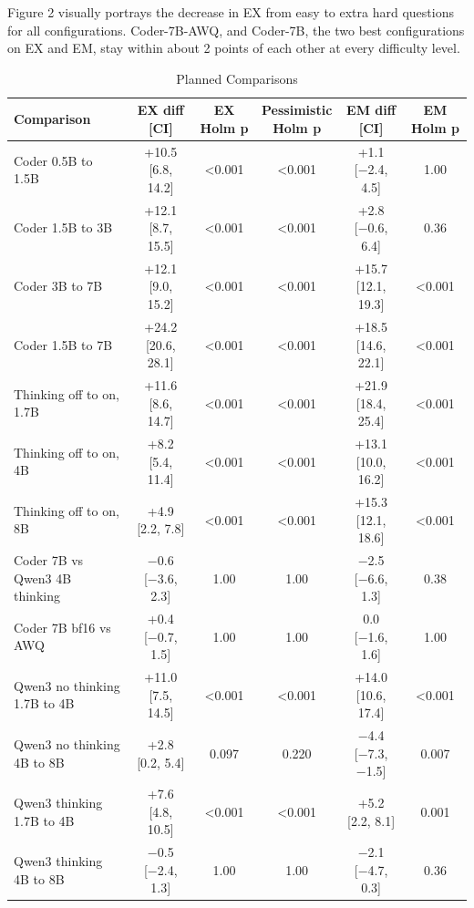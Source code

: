 Figure 2 visually portrays the decrease in EX from easy to extra hard questions for all configurations. Coder-7B-AWQ, and Coder-7B, the two best configurations on EX and EM, stay within about 2 points of each other at every difficulty level.

\begin{table}[!htbp]
\centering
\caption{Planned Comparisons}
\label{tab:4}
\small
\begin{adjustbox}{max width=\linewidth}
\begin{tabular}{@{}lccccc@{}}
\toprule
Comparison & EX diff [CI] & EX Holm p & \makecell{Pessimistic \\ {}Holm p} & EM diff [CI] & EM Holm p \\
\midrule
Coder 0.5B to 1.5B & +10.5 [6.8, 14.2] & \textless{}0.001 & \textless{}0.001 & +1.1 [−2.4, 4.5] & 1.00 \\
Coder 1.5B to 3B & +12.1 [8.7, 15.5] & \textless{}0.001 & \textless{}0.001 & +2.8 [−0.6, 6.4] & 0.36 \\
Coder 3B to 7B & +12.1 [9.0, 15.2] & \textless{}0.001 & \textless{}0.001 & +15.7 [12.1, 19.3] & \textless{}0.001 \\
Coder 1.5B to 7B & +24.2 [20.6, 28.1] & \textless{}0.001 & \textless{}0.001 & +18.5 [14.6, 22.1] & \textless{}0.001 \\
Thinking off to on, 1.7B & +11.6 [8.6, 14.7] & \textless{}0.001 & \textless{}0.001 & +21.9 [18.4, 25.4] & \textless{}0.001 \\
Thinking off to on, 4B & +8.2 [5.4, 11.4] & \textless{}0.001 & \textless{}0.001 & +13.1 [10.0, 16.2] & \textless{}0.001 \\
Thinking off to on, 8B & +4.9 [2.2, 7.8] & \textless{}0.001 & \textless{}0.001 & +15.3 [12.1, 18.6] & \textless{}0.001 \\
Coder 7B vs Qwen3 4B thinking & −0.6 [−3.6, 2.3] & 1.00 & 1.00 & −2.5 [−6.6, 1.3] & 0.38 \\
Coder 7B bf16 vs AWQ & +0.4 [−0.7, 1.5] & 1.00 & 1.00 & 0.0 [−1.6, 1.6] & 1.00 \\
Qwen3 no thinking 1.7B to 4B & +11.0 [7.5, 14.5] & \textless{}0.001 & \textless{}0.001 & +14.0 [10.6, 17.4] & \textless{}0.001 \\
Qwen3 no thinking 4B to 8B & +2.8 [0.2, 5.4] & 0.097 & 0.220 & −4.4 [−7.3, −1.5] & 0.007 \\
Qwen3 thinking 1.7B to 4B & +7.6 [4.8, 10.5] & \textless{}0.001 & \textless{}0.001 & +5.2 [2.2, 8.1] & 0.001 \\
Qwen3 thinking 4B to 8B & −0.5 [−2.4, 1.3] & 1.00 & 1.00 & −2.1 [−4.7, 0.3] & 0.36 \\

\end{tabular}
\end{adjustbox}
\end{table}
